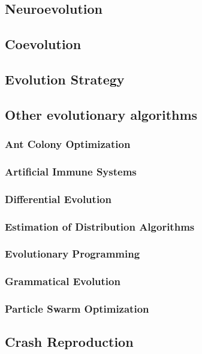     \subsection{Neuroevolution}
    \label{sec:future:ne}
      \Blindtext
    \subsection{Coevolution}
    \label{sec:future:coev}
      \Blindtext
    \subsection{Evolution Strategy}
    \label{sec:future:es}
      \Blindtext
    \subsection{Other evolutionary algorithms}
    \label{sec:future:other}
      \subsubsection{Ant Colony Optimization}
      \subsubsection{Artificial Immune Systems}
      \subsubsection{Differential Evolution}
      \subsubsection{Estimation of Distribution Algorithms}
      \subsubsection{Evolutionary Programming}
      \subsubsection{Grammatical Evolution}
      \subsubsection{Particle Swarm Optimization}
    \subsection{Crash Reproduction}
    \label{sec:future:beacon}
      \Blindtext
